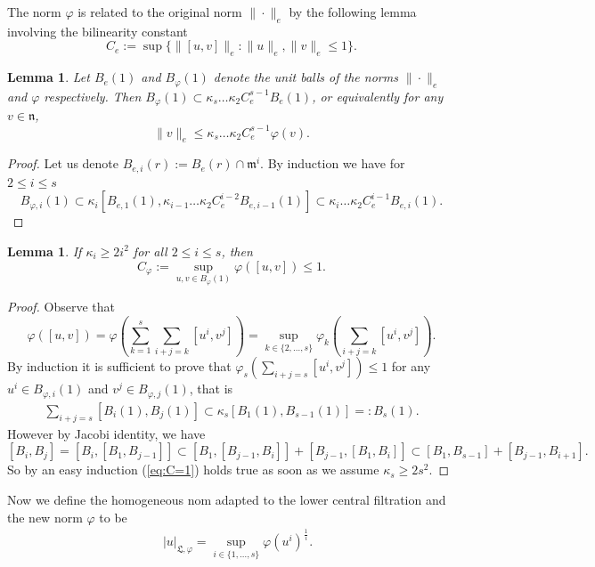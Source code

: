 \documentclass[11pt,leqno]{article}
\theoremstyle{plain}
\newtheorem{lemma}[theorem]{Lemma}
\theoremstyle{definition}
\theoremstyle{remark}
\numberwithin{equation}{section}
\begin{document}
The norm $\varphi$ is related to the original norm $\|\cdot\|_e$ by the following lemma involving the bilinearity constant
\[
C_e:=\sup\{\|[u,v]\|_e: \|u\|_e, \|v\|_e \le 1\}.
\]

\begin{lemma}\label{lem:efi}
Let $B_e(1)$ and  $B_\varphi(1)$ denote the unit balls of the norms $\|\cdot\|_e$ and $\varphi$ respectively. Then
$B_{\varphi}(1) \subset \kappa_s\dots \kappa_2 C_e^{s-1}B_{e}(1)$,
or equivalently for any $v\in \mathfrak{n}$,
\[
\|v\|_e \le \kappa_s\dots\kappa_2C_e^{s-1} \varphi(v).
\]
\end{lemma}

\begin{proof} Let us denote  $B_{e,i}(r):=B_e(r)\cap \mathfrak{m}^i$. By induction we have for $2\le i\le s$
\[
B_{\varphi,i}(1) \subset \kappa_i[B_{e,1}(1),\kappa_{i-1}\dots \kappa_2C_e^{i-2}B_{e,i-1}(1)] \subset \kappa_{i}\dots \kappa_2C_e^{i-1}B_{e,i}(1).
\]
\end{proof}

\begin{lemma}\label{lem:C=1}
If $\kappa_i\ge 2i^2$ for all $2\le i \le s$, then 
\[
C_\varphi:=\sup_{u,v\in B_\varphi(1)} \varphi\left([u,v]\right) \le 1.
\]
\end{lemma}

\begin{proof}
Observe that
\[
\varphi([u,v])=\varphi\left(\sum_{k=1}^s \sum_{i+j=k} [u^i,v^j] \right)=\sup_{k\in\{2,\dots,s\}}\varphi_k\left(\sum_{i+j=k}[u^i,v^j] \right).
\]
By induction it is sufficient to prove that $\varphi_s\left( \sum_{i+j=s} [u^i,v^j]\right) \le 1$ for any $u^i \in B_{\varphi,i}(1)$ and $v^j\in B_{\varphi,j}(1)$, that is 
\begin{align}\label{eq:C=1}
\sum_{i+j=s}[B_i(1),B_j(1)] \subset \kappa_s [B_1(1),B_{s-1}(1)]=:B_s(1).
\end{align}
However by Jacobi identity, we have
\[
[B_i,B_j]=[B_i,[B_1,B_{j-1}]] \subset [B_1,[B_{j-1},B_i]]+[B_{j-1},[B_1,B_i]]\subset [B_1,B_{s-1}]+[B_{j-1},B_{i+1}].
\]
So by an easy induction (\ref{eq:C=1}) holds true as soon as we assume $\kappa_s\ge 2s^2$. 
\end{proof}

Now we define the homogeneous nom adapted to the lower central filtration and the new norm $\varphi$ to be
\begin{align*}%
\quad |u|_{\mathfrak{L},\varphi}=\sup_{i\in\{1,\dots,s\}} \varphi(u^i)^{\frac{1}{i}}.%
\end{align*}
\end{document}
